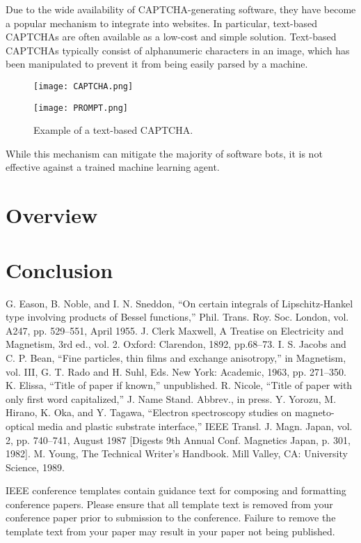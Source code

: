 \documentclass[11pt,conference]{IEEEtran}
\begin{document}
Due to the wide availability of CAPTCHA-generating software, they have become a popular
mechanism to integrate into websites. In particular, text-based CAPTCHAs are
often available as a low-cost and simple solution. Text-based CAPTCHAs
typically consist of alphanumeric characters in an image, which has been
manipulated to prevent it from being easily parsed by a machine. 

\begin{figure}[htbp]
    \centerline{\texttt{[image: CAPTCHA.png]}}
    \centerline{\texttt{[image: PROMPT.png]}}
    \caption{Example of a text-based CAPTCHA.}
    \label{figure}
\end{figure}

While this mechanism can mitigate the majority of software bots, it is not
effective against a trained machine learning agent.
\section{Overview}

\section{Conclusion}



\begin{thebibliography}{00}
     G. Eason, B. Noble, and I. N. Sneddon, ``On certain integrals of Lipschitz-Hankel type involving products of Bessel functions,'' Phil. Trans. Roy. Soc. London, vol. A247, pp. 529--551, April 1955.
     J. Clerk Maxwell, A Treatise on Electricity and Magnetism, 3rd ed., vol. 2. Oxford: Clarendon, 1892, pp.68--73.
     I. S. Jacobs and C. P. Bean, ``Fine particles, thin films and exchange anisotropy,'' in Magnetism, vol. III, G. T. Rado and H. Suhl, Eds. New York: Academic, 1963, pp. 271--350.
     K. Elissa, ``Title of paper if known,'' unpublished.
     R. Nicole, ``Title of paper with only first word capitalized,'' J. Name Stand. Abbrev., in press.
     Y. Yorozu, M. Hirano, K. Oka, and Y. Tagawa, ``Electron spectroscopy studies on magneto-optical media and plastic substrate interface,'' IEEE Transl. J. Magn. Japan, vol. 2, pp. 740--741, August 1987 [Digests 9th Annual Conf. Magnetics Japan, p. 301, 1982].
     M. Young, The Technical Writer's Handbook. Mill Valley, CA: University Science, 1989.
\end{thebibliography}
\vspace{12pt}
\color{red}
IEEE conference templates contain guidance text for composing and formatting conference papers. Please ensure that all template text is removed from your conference paper prior to submission to the conference. Failure to remove the template text from your paper may result in your paper not being published.
\end{document}
